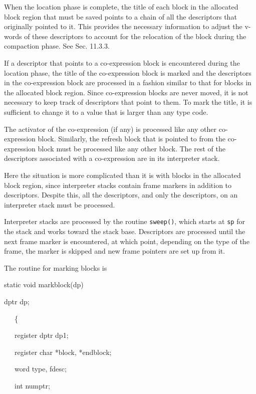 When the location phase is complete, the title of each block in the
allocated block region that must be saved points to a chain of all the
descriptors that originally pointed to it. This provides the necessary
information to adjust the v-words of these descriptors to account for
the relocation of the block during the compaction phase. See
Sec. 11.3.3.

If a descriptor that points to a co-expression block is encountered
during the location phase, the title of the co-expression block is
marked and the descriptors in the co-expression block are processed in
a fashion similar to that for blocks in the allocated block
region. Since co-expression blocks are never moved, it is not
necessary to keep track of descriptors that point to them. To mark the
title, it is sufficient to change it to a value that is larger than
any type code.

The activator of the co-expression (if any) is processed like any
other co-expression block. Similarly, the refresh block that is
pointed to from the co-expression block must be processed like any
other block. The rest of the descriptors associated with a
co-expression are in its interpreter stack.

Here the situation is more complicated than it is with blocks in the
allocated block region, since interpreter stacks contain frame markers
in addition to descriptors. Despite this, all the descriptors, and
only the descriptors, on an interpreter stack must be processed.

Interpreter stacks are processed by the routine \texttt{sweep()},
which starts at \texttt{sp} for the stack and works toward the stack
base. Descriptors are processed until the next frame marker is
encountered, at which point, depending on the type of the frame, the
marker is skipped and new frame pointers are set up from it.

The routine for marking blocks is

{\ttfamily\mdseries
static void markblock(dp)
}

{\ttfamily\mdseries
dptr dp;
}

{\ttfamily\mdseries
\ \ \ \{
}

{\ttfamily\mdseries
\ \ \ register dptr dp1;
}

{\ttfamily\mdseries
\ \ \ register char *block, *endblock;
}

{\ttfamily\mdseries
\ \ \ word type, fdesc;
}

{\ttfamily\mdseries
\ \ \ int numptr;
}

